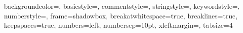      {                              %
        backgroundcolor=\color{white},                              %
        basicstyle=\color{white}\fontsize{9}{11}\ttfamily,          %
        commentstyle=\color{IndigoMD},                              %
        stringstyle=\color{TealMD},                                 %
        keywordstyle=\color{DeepPurpleMD},                          %
        numberstyle=\tiny\color{TealMD},                            %
        frame=shadowbox,                                            %
        breakatwhitespace=true,                                     %
        breaklines=true,                                            %
        keepspaces=true,                                            %
        numbers=left,                                               %
        numbersep=10pt,                                             %
        xleftmargin=\parindent,                                     %
        tabsize=4                                                   %
    }
 
    \lstset{style=CompilandoStyle}                                  %









